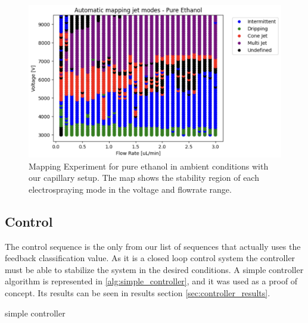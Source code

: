     \begin{figure}[H]
        \center
        \includegraphics[width=15cm]{Figuras/report4/map-2023-03-02.png}
        \caption{Mapping Experiment for pure ethanol in ambient conditions with our capillary setup. The map shows the stability region of each electrospraying mode in the voltage and flowrate range.}
        \label{fig:map3Data_fig}
    \end{figure}



\subsection{Control}

    The control sequence is the only from our list of sequences that actually uses the feedback classification value. 
    As it is a closed loop control system the controller must be able to stabilize the system in the desired conditions.
    A simple controller algorithm is represented in \ref{alg:simple_controller}, and it was used as a proof of concept.
    Its results can be seen in results section \ref{sec:controller_results}.

    \begin{algorithm}
        \caption{simple controller}\label{alg:simple_controller}
        \begin{algorithmic}
            
                \State {}
                \State {}
            \EndIf

        \EndFunction
        \end{algorithmic}
    \end{algorithm}



